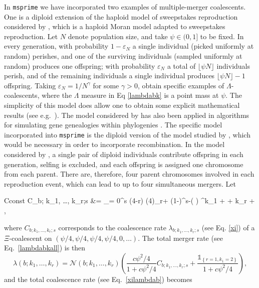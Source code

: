 \documentclass{article}
\newcommand{\msprime}[0]{{\texttt{msprime} }}
\newcommand{\be}{\begin{equation}}
\newcommand{\ee}{\end{equation}}
\newcommand{\one}[1]{\ensuremath{\mathds{1}_{\left\{ #1 \right\}}}}%
\begin{document}
In \msprime we have incorporated two examples of multiple-merger
coalescents.  One is a diploid extension \citep{BBE13} of the haploid
model of sweepstakes reproduction considered by \cite{EW06}, which is
a haploid Moran model adapted to sweepstakes reproduction.  Let $N$
denote population size, and take $\psi \in (0,1]$ to be fixed.  In
every generation, with probability $1-\varepsilon_N$ a single
individual (picked uniformly at random) perishes, and one of the
surviving individuals (sampled uniformly at random) produces one
offspring; with probability $\varepsilon_N$ a total of
$\lfloor \psi N \rfloor$ individuals perish, and of the remaining
individuals a single individual produces $\lfloor \psi N \rfloor -1 $
offspring.  Taking $\varepsilon_N = 1/N^\gamma$ for some $\gamma > 0$,
\cite{EW06} obtain specific examples of $\Lambda$-coalescents, where
the $\Lambda$ measure in Eq \eqref{lambdabk} is a point mass at
$\psi$.  The simplicity of this model does allow one to obtain some
explicit mathematical results (see e.g.\
\cite{EF2018,Matuszewski2017,Der2012,Freund2020}). The model
considered by \cite{EW06} has also been applied in algorithms for
simulating gene genealogies within phylogenies \citep{Zhu2015}. The
 specific model incorporated into \msprime is the diploid version
\citep{BBE13} of the model studied by \cite{EW06}, which would be
necessary in order to incorporate recombination.  In the model
considered by \cite{BBE13}, a single pair of diploid individuals
contribute offspring in each generation, selfing is excluded, and each
offspring is assigned one chromosome from each parent. There are,
therefore, four parent chromosomes involved in each reproduction
event, which can lead to up to four simultaneous mergers.  Let
\begin{esplit}{Cconst}
C_{b; k_1, \ldots, k_r;s } &=   \sum_{\ell = 0}^{s \wedge (4-r)}  (4)_{r+\ell} (1-\psi)^{s-\ell }\left(  \right) ^{k_1 + \cdots + k_r + \ell},  \\
\end{esplit}
where  $C_{b; k_1, \ldots, k_r;s }$ corresponds to the coalescence rate $ \lambda_{b;k_1, \ldots, k_r;s}$ (see Eq. \eqref{xi}) of a  $\Xi$-coalescent on  $(\psi/4, \psi/4, \psi/4, \psi/4, 0, \ldots)$.
The total merger rate (see Eq.\ \eqref{lambdabkall}) is then 
\be\label{xidirlambdabk}
      \lambda(b;k_1, \ldots, k_r) =    \mathcal{N}(b; k_1, \ldots, k_r ) \left( \frac{c\psi^2/4}{1 +  c\psi^2/4}C_{b; k_1, \ldots, k_r;s } +     \frac{ \one{r=1, k_1 = 2} }{1 +  c\psi^2/4}  \right),
\ee
and the total coalescence rate (see Eq.\ \eqref{xilambdab}) becomes
\end{document}
